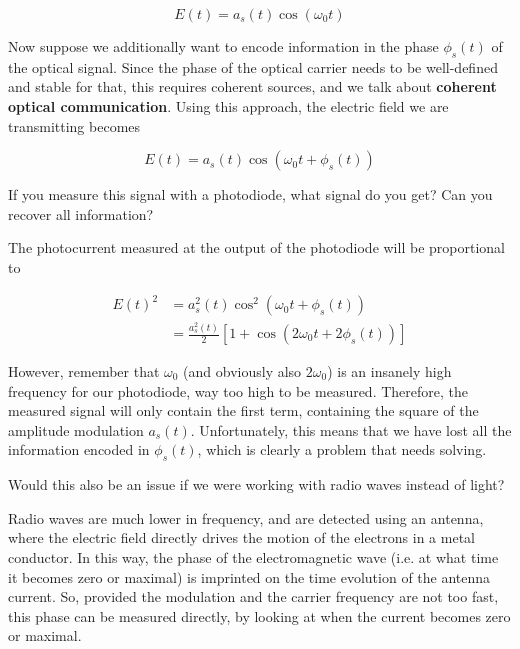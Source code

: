 \begin{equation}
E(t) = a_s(t) \cos(\omega_0 t)
\end{equation}

Now suppose we additionally want to encode information in the phase $\phi_s(t)$ of the optical signal. Since the phase of the optical carrier needs to be well-defined and stable for that, this requires coherent sources, and we talk about \textbf{coherent optical communication}. Using this approach, the electric field we are transmitting becomes

\begin{equation}
 E(t) = a_s(t) \cos\left(\omega_0 t + \phi_s(t)\right)  
 \label{eq-electric-field-modulated} 
\end{equation}

\begin{cue}
If you measure this signal with a photodiode, what signal do you get? Can you recover all information?  
\end{cue}
    
The photocurrent measured at the output of the photodiode will be proportional to

\begin{align}
 E(t)^2 &= a_s^2(t) \cos^2\left(\omega_0 t + \phi_s(t)\right) \nonumber \\
 &= \frac{a_s^2(t)}{2} \left[ 1 + \cos\left(2\omega_0 t + 2\phi_s(t)\right)\right]  
 \label{eq-photocurrent-detected}
\end{align}

However, remember that $\omega_0$ (and obviously also $2\omega_0$) is an insanely high frequency for our photodiode, way too high to be measured. Therefore, the measured signal will only contain the first term, containing the square of the amplitude modulation $a_s(t)$. Unfortunately, this means that we have lost all the information encoded in $\phi_s(t)$, which is clearly a problem that needs solving.
    
\begin{cue}
Would this also be an issue if we were working with radio waves instead of light?  
\end{cue}
    
Radio waves are much lower in frequency, and are detected using an antenna, where the electric field directly drives the motion of the electrons in a metal conductor. In this way, the phase of the electromagnetic wave (i.e. at what time it becomes zero or maximal) is imprinted on the time evolution of the antenna current. So, provided the modulation and the carrier frequency are not too fast, this phase can be measured directly, by looking at when the current becomes zero or maximal.

